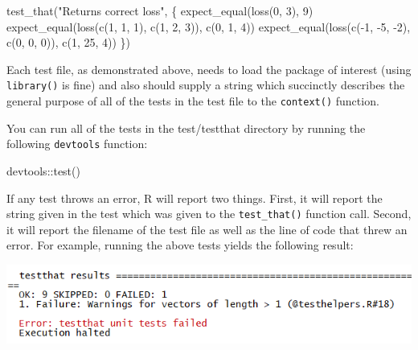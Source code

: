 \documentclass[
]{book}
\newenvironment{Shaded}{\begin{snugshade}}{\end{snugshade}}
\newcommand{\DecValTok}[1]{\textcolor[rgb]{0.00,0.00,0.81}{#1}}
\newcommand{\FunctionTok}[1]{\textcolor[rgb]{0.00,0.00,0.00}{#1}}
\newcommand{\NormalTok}[1]{#1}
\newcommand{\SpecialCharTok}[1]{\textcolor[rgb]{0.00,0.00,0.00}{#1}}
\newcommand{\StringTok}[1]{\textcolor[rgb]{0.31,0.60,0.02}{#1}}
\begin{document}
\begin{Shaded}
\begin{Highlighting}[]
\FunctionTok{test\_that}\NormalTok{(}\StringTok{"Returns correct loss"}\NormalTok{, \{}
  \FunctionTok{expect\_equal}\NormalTok{(}\FunctionTok{loss}\NormalTok{(}\DecValTok{0}\NormalTok{, }\DecValTok{3}\NormalTok{), }\DecValTok{9}\NormalTok{)}
  \FunctionTok{expect\_equal}\NormalTok{(}\FunctionTok{loss}\NormalTok{(}\FunctionTok{c}\NormalTok{(}\DecValTok{1}\NormalTok{, }\DecValTok{1}\NormalTok{, }\DecValTok{1}\NormalTok{), }\FunctionTok{c}\NormalTok{(}\DecValTok{1}\NormalTok{, }\DecValTok{2}\NormalTok{, }\DecValTok{3}\NormalTok{)), }\FunctionTok{c}\NormalTok{(}\DecValTok{0}\NormalTok{, }\DecValTok{1}\NormalTok{, }\DecValTok{4}\NormalTok{))}
  \FunctionTok{expect\_equal}\NormalTok{(}\FunctionTok{loss}\NormalTok{(}\FunctionTok{c}\NormalTok{(}\SpecialCharTok{{-}}\DecValTok{1}\NormalTok{, }\SpecialCharTok{{-}}\DecValTok{5}\NormalTok{, }\SpecialCharTok{{-}}\DecValTok{2}\NormalTok{), }\FunctionTok{c}\NormalTok{(}\DecValTok{0}\NormalTok{, }\DecValTok{0}\NormalTok{, }\DecValTok{0}\NormalTok{)), }\FunctionTok{c}\NormalTok{(}\DecValTok{1}\NormalTok{, }\DecValTok{25}\NormalTok{, }\DecValTok{4}\NormalTok{))}
\NormalTok{\})}
\end{Highlighting}
\end{Shaded}

Each test file, as demonstrated above, needs to load the package of interest (using \texttt{library()} is fine) and also should supply a string which succinctly describes the general purpose of all of the tests in the test file to the \texttt{context()} function.

You can run all of the tests in the test/testthat directory by running the following \texttt{devtools} function:

\begin{Shaded}
\begin{Highlighting}[]
\NormalTok{devtools}\SpecialCharTok{::}\FunctionTok{test}\NormalTok{()}
\end{Highlighting}
\end{Shaded}

If any test throws an error, R will report two things. First, it will report the string given in the test which was given to the \texttt{test\_that()} function call. Second, it will report the filename of the test file as well as the line of code that threw an error. For example, running the above tests yields the following result:

\includegraphics{images/testSS/testthaterror1.PNG}
\end{document}

